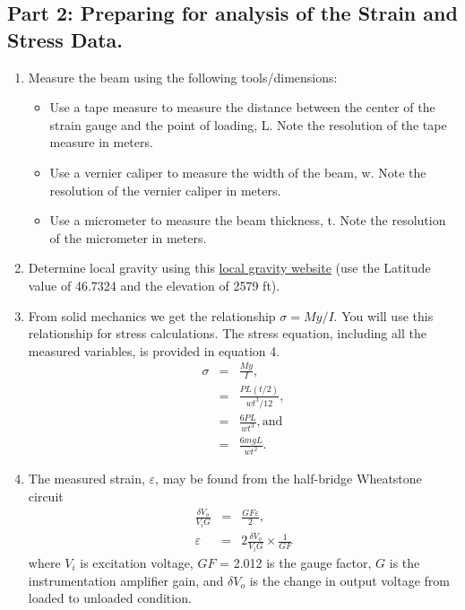 \documentclass{article} %
\begin{document}
\subsection{Part 2: Preparing for analysis of the Strain and Stress Data.}
\begin{enumerate}
    \item Measure the beam using the following tools/dimensions:
    \begin{itemize}
        \item Use a tape measure to measure the distance between the center of the strain gauge and the point of loading, L. Note the resolution of the tape measure in meters.
        \item Use a vernier caliper to measure the width of the beam, w. Note the resolution of the vernier caliper in meters.
        \item Use a micrometer to measure the beam thickness, t. Note the resolution of the micrometer in meters.
    \end{itemize} 
    \item Determine local gravity using this \href{https://www.sensorsone.com/local-gravity-calculator/}{local gravity website}  (use the Latitude value of 46.7324 and the elevation of 2579 ft).
    \item From solid mechanics we get the relationship $\sigma = My/I$. You will use this relationship for stress calculations. The stress equation, including all the measured variables, is provided in equation 4.
    \begin{eqnarray}
    \sigma &=& \frac{M y}{I}, \\
      &=& \frac{P L (t/2)}{w t^3 / 12}, \\
      &=& \frac{6PL}{wt^3}, \textrm{and} \\
      &=& \frac{6mgL}{wt^2}.
    \end{eqnarray}
    \item The measured strain, $\varepsilon $, may be found from the half-bridge Wheatstone  circuit
    \begin{eqnarray}
    \frac{\delta V_o}{V_i  G} &=& \frac{GF \varepsilon }{2},\\
    \varepsilon  &=& 2 \frac{\delta V_o}{V_i G} \times \frac{1}{GF}
    \end{eqnarray}
    where $V_i$ is excitation voltage, $GF$ = 2.012 is the gauge factor, $G$ is the instrumentation amplifier gain, and $\delta V_o$ is the change in output voltage from loaded to unloaded condition. 
\end{enumerate}
\end{document}
